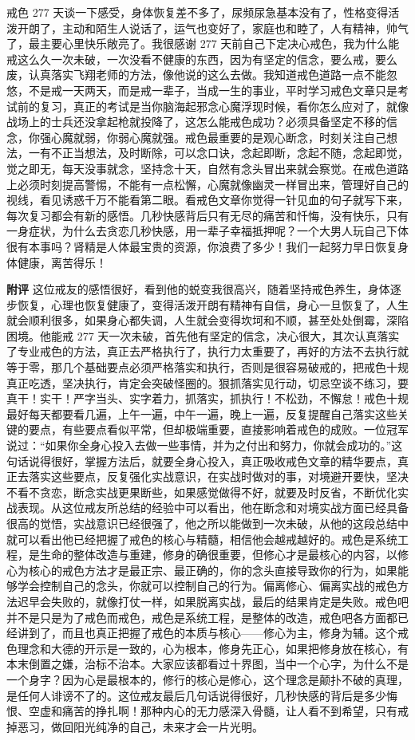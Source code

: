 \begin{case}
    戒色 277 天谈一下感受，身体恢复差不多了，尿频尿急基本没有了，性格变得活泼开朗了，主动和陌生人说话了，运气也变好了，家庭也和睦了，人有精神，帅气了，最主要心里快乐敞亮了。我很感谢 277 天前自己下定决心戒色，我为什么能戒这么久一次未破，一次没看不健康的东西，因为有坚定的信念，要么戒，要么废，认真落实飞翔老师的方法，像他说的这么去做。我知道戒色道路一点不能忽悠，不是戒一天两天，而是戒一辈子，当成一生的事业，平时学习戒色文章只是考试前的复习，真正的考试是当你脑海起邪念心魔浮现时候，看你怎么应对了，就像战场上的士兵还没拿起枪就投降了，这怎么能戒色成功？必须具备坚定不移的信念，你强心魔就弱，你弱心魔就强。戒色最重要的是观心断念，时刻关注自己想法，一有不正当想法，及时断除，可以念口诀，念起即断，念起不随，念起即觉，觉之即无，每天没事就念，坚持念十天，自然有念头冒出来就会察觉。在戒色道路上必须时刻提高警惕，不能有一点松懈，心魔就像幽灵一样冒出来，管理好自己的视线，看见诱惑千万不能看第二眼。看戒色文章你觉得一针见血的句子就写下来，每次复习都会有新的感悟。几秒快感背后只有无尽的痛苦和忏悔，没有快乐，只有一身症状，为什么去贪恋几秒快感，用一辈子幸福抵押呢？一个大男人玩自己下体很有本事吗？肾精是人体最宝贵的资源，你浪费了多少！我们一起努力早日恢复身体健康，离苦得乐！

    \textbf{附评} 这位戒友的感悟很好，看到他的蜕变我很高兴，随着坚持戒色养生，身体逐步恢复，心理也恢复健康了，变得活泼开朗有精神有自信，身心一旦恢复了，人生就会顺利很多，如果身心都失调，人生就会变得坎坷和不顺，甚至处处倒霉，深陷困境。他能戒 277 天一次未破，首先他有坚定的信念，决心很大，其次认真落实了专业戒色的方法，真正去严格执行了，执行力太重要了，再好的方法不去执行就等于零，那几个基础要点必须严格落实和执行，否则是很容易破戒的，把戒色十规真正吃透，坚决执行，肯定会突破怪圈的。狠抓落实见行动，切忌空谈不练习，要真干！实干！严字当头、实字着力，抓落实，抓执行！不松劲，不懈怠！戒色十规最好每天都要看几遍，上午一遍，中午一遍，晚上一遍，反复提醒自己落实这些关键的要点，有些要点看似平常，但却极端重要，直接影响着戒色的成败。一位冠军说过：“如果你全身心投入去做一些事情，并为之付出和努力，你就会成功的。”这句话说得很好，掌握方法后，就要全身心投入，真正吸收戒色文章的精华要点，真正去落实这些要点，反复强化实战意识，在实战时做对的事，对境避开要快，坚决不看不贪恋，断念实战更果断些，如果感觉做得不好，就要及时反省，不断优化实战表现。从这位戒友所总结的经验中可以看出，他在断念和对境实战方面已经具备很高的觉悟，实战意识已经很强了，他之所以能做到一次未破，从他的这段总结中就可以看出他已经把握了戒色的核心与精髓，相信他会越戒越好的。戒色是系统工程，是生命的整体改造与重建，修身的确很重要，但修心才是最核心的内容，以修心为核心的戒色方法才是最正宗、最正确的，你的念头直接导致你的行为，如果能够学会控制自己的念头，你就可以控制自己的行为。偏离修心、偏离实战的戒色方法迟早会失败的，就像打仗一样，如果脱离实战，最后的结果肯定是失败。戒色吧并不是只是为了戒色而戒色，戒色是系统工程，是整体的改造，戒色吧各方面都已经讲到了，而且也真正把握了戒色的本质与核心——修心为主，修身为辅。这个戒色理念和大德的开示是一致的，心为根本，修身先正心，如果把修身放在核心，有本末倒置之嫌，治标不治本。大家应该都看过十界图，当中一个心字，为什么不是一个身字？因为心是最根本的，修行的核心是修心，这个理念是颠扑不破的真理，是任何人诽谤不了的。这位戒友最后几句话说得很好，几秒快感的背后是多少悔恨、空虚和痛苦的挣扎啊！那种内心的无力感深入骨髓，让人看不到希望，只有戒掉恶习，做回阳光纯净的自己，未来才会一片光明。


\end{case}
